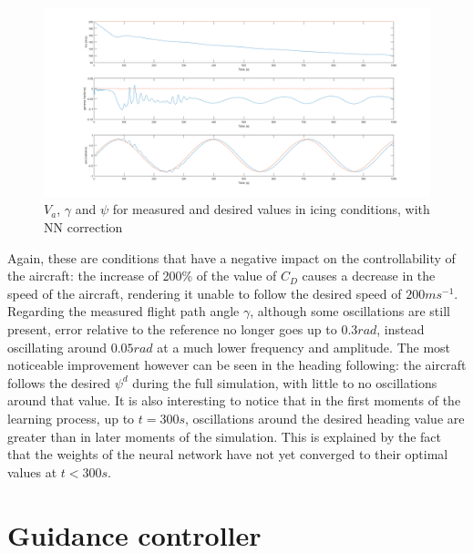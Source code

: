 \begin{figure}[H]
\centering
\includegraphics[width=1\textwidth]{Figures/Results/ref_icing_NN.PNG}
\caption[Reference following in icing conditions with NN correction]{$V_a$, $\gamma$ and $\psi$ for measured and desired values in icing conditions, with NN correction}
\label{fig:ref_icing_NN}
\end{figure}

Again, these are conditions that have a negative impact on the controllability of the aircraft: the increase of 200\% of the value of $C_D$ causes a decrease in the speed of the aircraft, rendering it unable to follow the desired speed of $200ms^{-1}$. Regarding the measured flight path angle $\gamma$, although  some oscillations are still present, error relative to the reference no longer goes up to $0.3 rad$, instead oscillating around $0.05rad$ at a much lower frequency and amplitude. The most noticeable improvement however can be seen in the heading following: the aircraft follows the desired $\psi^d$ during the full simulation, with little to no oscillations around that value. It is also interesting to notice that in the first moments of the learning process, up to $t=300s$, oscillations around the desired heading value are greater than in later moments of the simulation. This is explained by the fact that the weights of the neural network have not yet converged to their optimal values at $t<300s$.


\section{Guidance controller}
\label{section:results/guidance_control}
